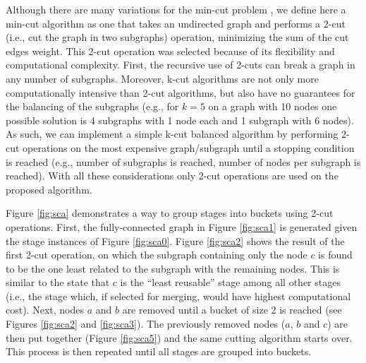Although there are many variations for the min-cut problem \cite{mincut,minkcut}, we define here a min-cut algorithm as one that takes an undirected graph and performs a 2-cut (i.e., cut the graph in two subgraphs) operation, minimizing the sum of the cut edges weight. This 2-cut operation was selected because of its flexibility and computational complexity. First, the recursive use of 2-cuts can break a graph in any number of subgraphs. Moreover, k-cut algorithms are not only more computationally intensive than 2-cut algorithms, but also have no guarantees for the balancing of the subgraphs (e.g., for $k=5$ on a graph with 10 nodes one possible solution is 4 subgraphs with 1 node each and 1 subgraph with 6 nodes). As such, we can implement a simple k-cut balanced algorithm by performing 2-cut operations on the most expensive graph/subgraph until a stopping condition is reached (e.g., number of subgraphs is reached, number of nodes per subgraph is reached). With all these considerations only 2-cut operations are used on the proposed algorithm.

Figure \ref{fig:sca} demonstrates a way to group stages into buckets using 2-cut operations. First, the fully-connected graph in Figure \ref{fig:sca1} is generated given the stage instances of Figure \ref{fig:sca0}. Figure \ref{fig:sca2} shows the result of the first 2-cut operation, on which the subgraph containing only the node $c$ is found to be the one least related to the subgraph with the remaining nodes. This is similar to the state that $c$ is the ``least reusable'' stage among all other stages (i.e., the stage which, if selected for merging, would have highest computational cost). Next, nodes $a$ and $b$ are removed until a bucket of size 2 is reached (see Figures \ref{fig:sca2} and \ref{fig:sca3}). The previously removed nodes ($a$, $b$ and $c$) are then put together (Figure \ref{fig:sca5}) and the same cutting algorithm starts over. This process is then repeated until all stages are grouped into buckets.



